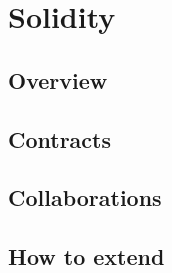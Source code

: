 \section{Solidity}

\subsection{Overview}
\subsection{Contracts} %
\subsection{Collaborations} %
\subsection{How to extend} %
